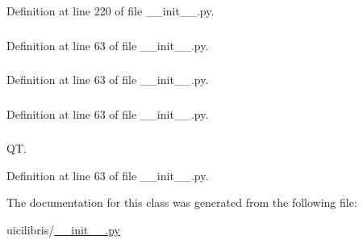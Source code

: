 \-Definition at line 220 of file \-\_\-\-\_\-init\-\_\-\-\_\-.\-py.

\hypertarget{classuicilibris_1_1w2mMainWindow_a73782bac2df26e751c3708d1d4bf91ea}{
\subsubsection[{ui}]{}}\label{classuicilibris_1_1w2mMainWindow_a73782bac2df26e751c3708d1d4bf91ea}


\-Definition at line 63 of file \-\_\-\-\_\-init\-\_\-\-\_\-.\-py.

\hypertarget{classuicilibris_1_1w2mMainWindow_a68829ffe68e143cc8b97935532cf61ba}{
\subsubsection[{wb}]{}}\label{classuicilibris_1_1w2mMainWindow_a68829ffe68e143cc8b97935532cf61ba}


\-Definition at line 63 of file \-\_\-\-\_\-init\-\_\-\-\_\-.\-py.

\hypertarget{classuicilibris_1_1w2mMainWindow_a33b1085f838c6856e90a6c84913bf524}{
\subsubsection[{wiki\-Index}]{}}\label{classuicilibris_1_1w2mMainWindow_a33b1085f838c6856e90a6c84913bf524}


\-Definition at line 63 of file \-\_\-\-\_\-init\-\_\-\-\_\-.\-py.

\hypertarget{classuicilibris_1_1w2mMainWindow_a7ba2f6374f9d3d52acf7f99f8eac18d1}{
\subsubsection[{window\-Title}]{}}\label{classuicilibris_1_1w2mMainWindow_a7ba2f6374f9d3d52acf7f99f8eac18d1}


\-Q\-T. 



\-Definition at line 63 of file \-\_\-\-\_\-init\-\_\-\-\_\-.\-py.



\-The documentation for this class was generated from the following file\-:\begin{DoxyCompactItemize}
\item 
uicilibris/\hyperlink{____init_____8py}{\-\_\-\-\_\-init\-\_\-\-\_\-.\-py}\end{DoxyCompactItemize}
